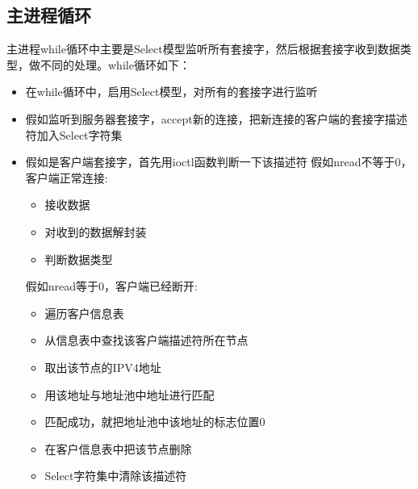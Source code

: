 \subsection{主进程循环}
主进程while循环中主要是Select模型监听所有套接字，然后根据套接字收到数据类型，做不同的处理。while循环如下：
\begin{itemize}
  \item 在while循环中，启用Select模型，对所有的套接字进行监听
  \item 假如监听到服务器套接字，accept新的连接，把新连接的客户端的套接字描述符加入Select字符集
  \item 假如是客户端套接字，首先用ioctl函数判断一下该描述符
  \subitem 假如nread不等于0，客户端正常连接:
    \begin{itemize}
      \item 接收数据
      \item 对收到的数据解封装
      \item 判断数据类型
    \end{itemize}
  \subitem 假如nread等于0，客户端已经断开:
    \begin{itemize}
      \item 遍历客户信息表
      \item 从信息表中查找该客户端描述符所在节点
      \item 取出该节点的IPV4地址
      \item 用该地址与地址池中地址进行匹配
      \item 匹配成功，就把地址池中该地址的标志位置0
      \item 在客户信息表中把该节点删除
      \item Select字符集中清除该描述符
    \end{itemize}
\end{itemize}

